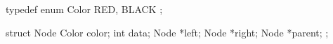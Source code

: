 typedef enum Color { RED, BLACK };

struct Node {
    Color color;
    int data;
    Node *left;
    Node *right;
    Node *parent;
};
